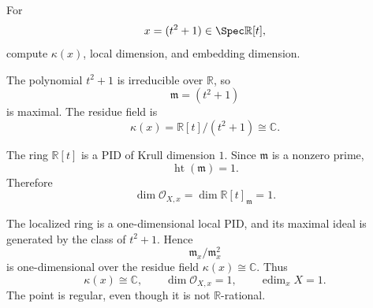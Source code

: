 \begin{problem}\label{prob:vi32-14}
For
\[
x=(t^2+1)\in\Spec\mathbb R[t],
\]
compute \(\kappa(x)\), local dimension, and embedding dimension.

\end{problem}

\ifdefined\FullProblemDossiers
\begin{solution}
The polynomial \(t^2+1\) is irreducible over \(\mathbb R\), so
\[
\mathfrak m=(t^2+1)
\]
is maximal. The residue field is
\[
\kappa(x)
=
\mathbb R[t]/(t^2+1)
\cong
\mathbb C.
\]

The ring \(\mathbb R[t]\) is a PID of Krull dimension \(1\). Since \(\mathfrak m\) is a nonzero prime,
\[
\operatorname{ht}(\mathfrak m)=1.
\]
Therefore
\[
\dim\mathcal O_{X,x}
=
\dim\mathbb R[t]_{\mathfrak m}
=
1.
\]

The localized ring is a one-dimensional local PID, and its maximal ideal is generated by the class of \(t^2+1\).
Hence
\[
\mathfrak m_x/\mathfrak m_x^2
\]
is one-dimensional over the residue field \(\kappa(x)\cong\mathbb C\). Thus
\[
\boxed{
\kappa(x)\cong\mathbb C,\qquad
\dim\mathcal O_{X,x}=1,\qquad
\operatorname{edim}_xX=1.
}
\]
The point is regular, even though it is not \(\mathbb R\)-rational.
\end{solution}
\fi
